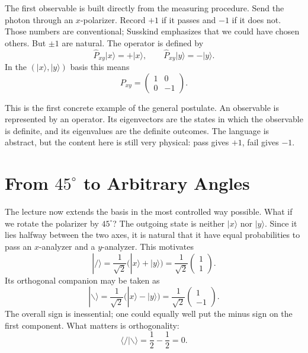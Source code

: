 The first observable is built directly from the measuring procedure. Send the photon through an \(x\)-polarizer. Record \(+1\) if it passes and \(-1\) if it does not. Those numbers are conventional; Susskind emphasizes that we could have chosen others. But \(\pm1\) are natural. The operator is defined by
\begin{equation}
\hat P_{xy}|x\rangle=+|x\rangle,
\qquad
\hat P_{xy}|y\rangle=-|y\rangle.
\end{equation}
In the \((|x\rangle,|y\rangle)\) basis this means
\begin{equation}
P_{xy}=
\begin{pmatrix}
1&0\\
0&-1
\end{pmatrix}.
\end{equation}

This is the first concrete example of the general postulate. An observable is represented by an operator. Its eigenvectors are the states in which the observable is definite, and its eigenvalues are the definite outcomes. The language is abstract, but the content here is still very physical: pass gives \(+1\), fail gives \(-1\).

\section{From \(45^\circ\) to Arbitrary Angles}

The lecture now extends the basis in the most controlled way possible. What if we rotate the polarizer by \(45^\circ\)? The outgoing state is neither \(|x\rangle\) nor \(|y\rangle\). Since it lies halfway between the two axes, it is natural that it have equal probabilities to pass an \(x\)-analyzer and a \(y\)-analyzer. This motivates
\begin{equation}
|/\rangle=\frac{1}{\sqrt2}\bigl(|x\rangle+|y\rangle\bigr)
=
\frac{1}{\sqrt2}
\begin{pmatrix}
1\\
1
\end{pmatrix}.
\end{equation}
Its orthogonal companion may be taken as
\begin{equation}
|\backslash\rangle=\frac{1}{\sqrt2}\bigl(|x\rangle-|y\rangle\bigr)
=
\frac{1}{\sqrt2}
\begin{pmatrix}
1\\
-1
\end{pmatrix}.
\end{equation}
The overall sign is inessential; one could equally well put the minus sign on the first component. What matters is orthogonality:
\begin{equation}
\langle /|\backslash\rangle=\frac12-\frac12=0.
\end{equation}

